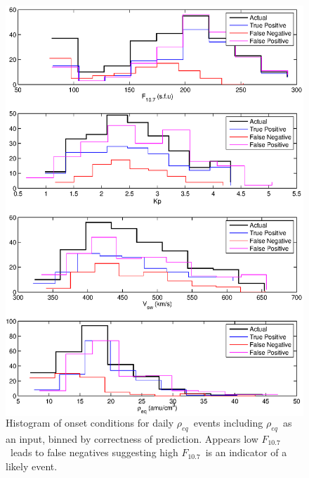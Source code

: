\documentclass[xcolor={dvipsnames,table}]{beamer}
\newcommand{\req}{\ensuremath{\rho_{eq}}} %
\newcommand{\f}{\ensuremath{F_{10.7}}} %
\begin{document}
\begin{frame}
	\begin{figure}[htp!]
		\centering
		\begin{columns}
			
		\includegraphics[width=0.85\linewidth]{Figures/CH5/NNBinaryOnset-full-daily-withreq-hist.eps}
		\caption{Histogram of onset conditions for daily \req\ events including \req\ as an input, binned by correctness of prediction. Appears low \f\ leads to false negatives suggesting high \f\ is an indicator of a likely event.}
				\end{columns}
		\label{fig:OnsetWithreq-hist-full}
	\end{figure}
\end{frame}

\end{document}
